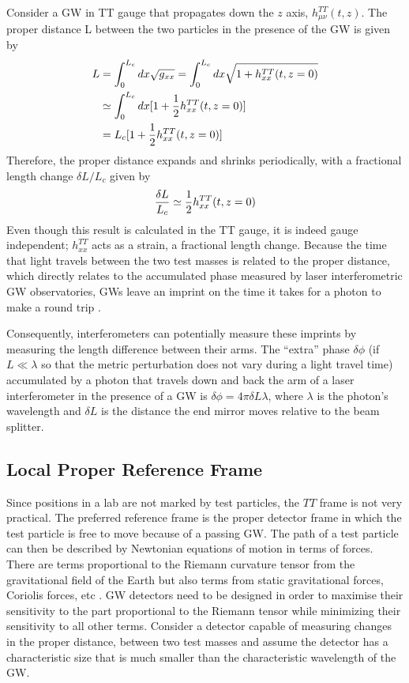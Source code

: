 \documentclass[binding=0.6cm, LaM]{sapthesis}
\begin{document}
        Consider a GW in TT gauge that propagates down the $z$ axis, $h^{TT}_{\mu\nu}(t,z)$.
        The proper distance L between the two particles in the presence of the GW is given by
        \begin{align}
          \label{distance}
          L & = \int^{L_c}_{0}{dx\sqrt{g_{xx}}} = \int^{L_c}_{0}dx\sqrt{1 + h^{TT}_{xx}(t,z=0)} \\
          & \simeq \int^{L_c}_{0}{dx[1 + {1 \over 2}h^{TT}_{xx}(t,z=0)]} \\
          &= L_c[1 + {1 \over 2}h^{TT}_{xx}(t,z=0)]
        \end{align}
        Therefore, the proper distance expands and shrinks periodically, with a fractional length change $\delta L/L_c$ given by
        \begin{equation}
          {{\delta L}\over{L_c}} \simeq {1 \over 2} h_{xx}^{TT}(t,z=0)
        \end{equation}
        Even though this result is calculated in the TT gauge, it is indeed gauge independent;
        $h_{xx}^{TT}$ acts as a strain, a fractional length change.
        Because the time that light travels between the two test masses is related to the proper distance,
        which directly relates to the accumulated phase measured by laser interferometric GW observatories,
        GWs leave an imprint on the time it takes for a photon to make a round trip \cite{4}.

        Consequently, interferometers can potentially measure these imprints by measuring the length difference between
        their arms. The “extra” phase $\delta \phi$ (if $L \ll \lambda$ so that the metric perturbation
	does not vary during a light travel time) accumulated by a photon that travels
        down and back the arm of a laser interferometer in the presence of a GW is $\delta \phi = 4\pi \delta L \lambda$,
        where $\lambda$ is the photon’s wavelength and $\delta L$ is the distance
        the end mirror moves relative to the beam splitter.

\subsection{Local Proper Reference Frame}
        Since positions in a lab are not marked by test particles,
        the $TT$ frame is not very practical.
        The preferred reference frame is the proper detector frame
        in which the test particle is free to move because of a passing GW.
        The path of a test particle can then be described by Newtonian equations of motion in terms of forces.
        There are terms proportional to the Riemann curvature tensor from the gravitational field of the Earth
        but also terms from static gravitational forces, Coriolis forces, etc \cite{5}.
	GW detectors need to be designed in order to maximise their sensitivity to the part proportional to the Riemann tensor while minimizing their sensitivity to all other terms.
        Consider a detector capable of measuring changes in the proper distance, between two test masses
        and assume the detector has a characteristic size that is much smaller
        than the characteristic wavelength of the GW.
\end{document}

